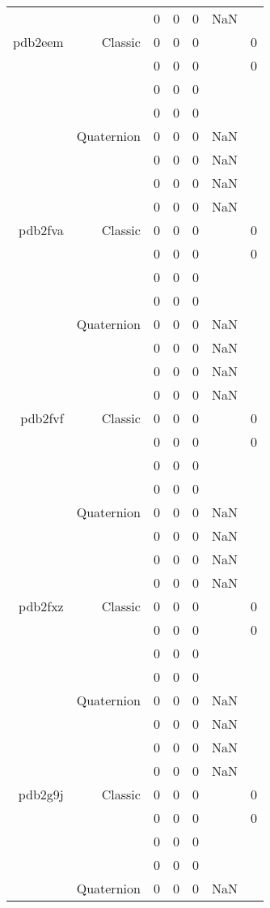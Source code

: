 \begin{xltabular}{\textwidth}{r|rcccSc}
& & 0 & 0 & 0 & NaN & \\ \addlinespace
pdb2eem & Classic & 0 & 0 & 0 & & 0 \\
& & 0 & 0 & 0 & & 0 \\
& & 0 & 0 & 0 & & \\
& & 0 & 0 & 0 & & \\
& Quaternion & 0 & 0 & 0 & NaN & \\
& & 0 & 0 & 0 & NaN & \\
& & 0 & 0 & 0 & NaN & \\
& & 0 & 0 & 0 & NaN & \\ \addlinespace
pdb2fva & Classic & 0 & 0 & 0 & & 0 \\
& & 0 & 0 & 0 & & 0 \\
& & 0 & 0 & 0 & & \\
& & 0 & 0 & 0 & & \\
& Quaternion & 0 & 0 & 0 & NaN & \\
& & 0 & 0 & 0 & NaN & \\
& & 0 & 0 & 0 & NaN & \\
& & 0 & 0 & 0 & NaN & \\ \addlinespace
pdb2fvf & Classic & 0 & 0 & 0 & & 0 \\
& & 0 & 0 & 0 & & 0 \\
& & 0 & 0 & 0 & & \\
& & 0 & 0 & 0 & & \\
& Quaternion & 0 & 0 & 0 & NaN & \\
& & 0 & 0 & 0 & NaN & \\
& & 0 & 0 & 0 & NaN & \\
& & 0 & 0 & 0 & NaN & \\ \addlinespace
pdb2fxz & Classic & 0 & 0 & 0 & & 0 \\
& & 0 & 0 & 0 & & 0 \\
& & 0 & 0 & 0 & & \\
& & 0 & 0 & 0 & & \\
& Quaternion & 0 & 0 & 0 & NaN & \\
& & 0 & 0 & 0 & NaN & \\
& & 0 & 0 & 0 & NaN & \\
& & 0 & 0 & 0 & NaN & \\ \addlinespace
pdb2g9j & Classic & 0 & 0 & 0 & & 0 \\
& & 0 & 0 & 0 & & 0 \\
& & 0 & 0 & 0 & & \\
& & 0 & 0 & 0 & & \\
& Quaternion & 0 & 0 & 0 & NaN & \\

\end{xltabular}
